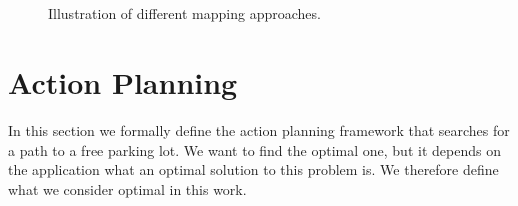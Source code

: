 \begin{figure}[ht]%
\centering
{} \\
 \\
\caption{Illustration of different mapping approaches.}
\label{fig:different_mappings}
\end{figure}

\section{Action Planning} %
\label{sec:action_planning}

In this section we formally define the action planning framework that searches
for a path to a free parking lot. We want to find the optimal one, but it
depends on the application what an optimal solution to this problem is. We
therefore define what we consider optimal in this work.

